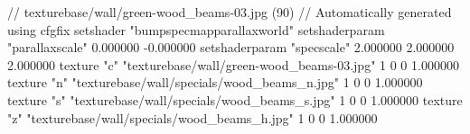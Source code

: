 // texturebase/wall/green-wood_beams-03.jpg (90)
// Automatically generated using cfgfix
setshader "bumpspecmapparallaxworld"
setshaderparam "parallaxscale" 0.000000 -0.000000
setshaderparam "specscale" 2.000000 2.000000 2.000000
texture "c" "texturebase/wall/green-wood_beams-03.jpg" 1 0 0 1.000000
texture "n" "texturebase/wall/specials/wood_beams_n.jpg" 1 0 0 1.000000
texture "s" "texturebase/wall/specials/wood_beams_s.jpg" 1 0 0 1.000000
texture "z" "texturebase/wall/specials/wood_beams_h.jpg" 1 0 0 1.000000
